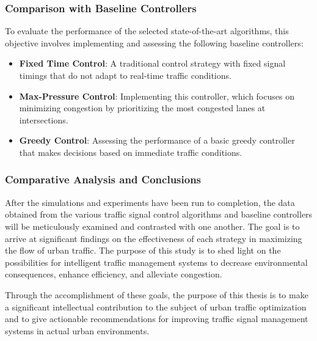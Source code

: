 \subsubsection{Comparison with Baseline Controllers}
To evaluate the performance of the selected state-of-the-art algorithms, this objective involves implementing and assessing the following baseline controllers:

\begin{itemize}
  \item \textbf{Fixed Time Control}: A traditional control strategy with fixed signal timings that do not adapt to real-time traffic conditions.
  
  \item \textbf{Max-Pressure Control}: Implementing this controller, which focuses on minimizing congestion by prioritizing the most congested lanes at intersections.
  
  \item \textbf{Greedy Control}: Assessing the performance of a basic greedy controller that makes decisions based on immediate traffic conditions.
\end{itemize}

\subsubsection{Comparative Analysis and Conclusions}
After the simulations and experiments have been run to completion, the data obtained from the various traffic signal control algorithms and baseline controllers will be meticulously examined and contrasted with one another. The goal is to arrive at significant findings on the effectiveness of each strategy in maximizing the flow of urban traffic. The purpose of this study is to shed light on the possibilities for intelligent traffic management systems to decrease environmental consequences, enhance efficiency, and alleviate congestion.

Through the accomplishment of these goals, the purpose of this thesis is to make a significant intellectual contribution to the subject of urban traffic optimization and to give actionable recommendations for improving traffic signal management systems in actual urban environments.
